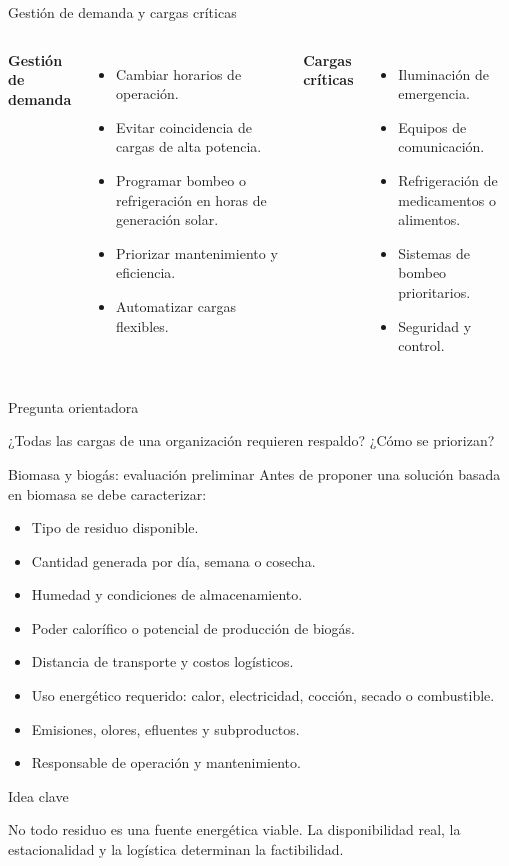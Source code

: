 \documentclass[aspectratio=169,10pt]{beamer}
\newcommand{\idea}[1]{
\begin{block}{Idea clave}
#1
\end{block}
}
\newcommand{\pregunta}[1]{
\begin{exampleblock}{Pregunta orientadora}
#1
\end{exampleblock}
}
\begin{document}
\begin{frame}{Gestión de demanda y cargas críticas}
\begin{columns}
\textbf{Gestión de demanda}
\begin{itemize}
    \item Cambiar horarios de operación.
    \item Evitar coincidencia de cargas de alta potencia.
    \item Programar bombeo o refrigeración en horas de generación solar.
    \item Priorizar mantenimiento y eficiencia.
    \item Automatizar cargas flexibles.
\end{itemize}

\textbf{Cargas críticas}
\begin{itemize}
    \item Iluminación de emergencia.
    \item Equipos de comunicación.
    \item Refrigeración de medicamentos o alimentos.
    \item Sistemas de bombeo prioritarios.
    \item Seguridad y control.
\end{itemize}
\end{columns}

\vspace{0.3cm}

\pregunta{
¿Todas las cargas de una organización requieren respaldo? ¿Cómo se priorizan?
}
\end{frame}

\begin{frame}{Biomasa y biogás: evaluación preliminar}
Antes de proponer una solución basada en biomasa se debe caracterizar:

\begin{itemize}
    \item Tipo de residuo disponible.
    \item Cantidad generada por día, semana o cosecha.
    \item Humedad y condiciones de almacenamiento.
    \item Poder calorífico o potencial de producción de biogás.
    \item Distancia de transporte y costos logísticos.
    \item Uso energético requerido: calor, electricidad, cocción, secado o combustible.
    \item Emisiones, olores, efluentes y subproductos.
    \item Responsable de operación y mantenimiento.
\end{itemize}

\idea{
No todo residuo es una fuente energética viable. La disponibilidad real, la estacionalidad y la logística determinan la factibilidad.
}
\end{frame}
\end{document}

